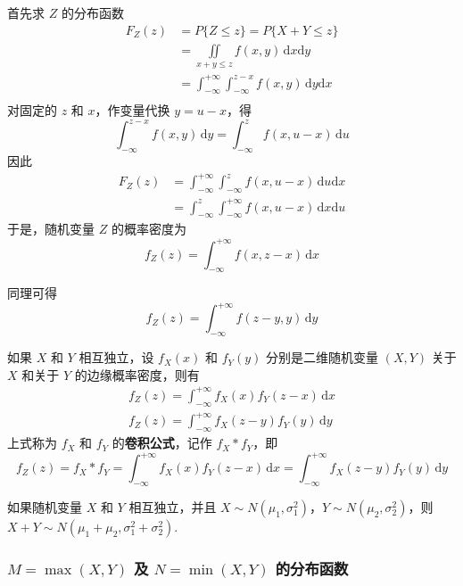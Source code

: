 \begin{myproof}
    首先求 $Z$ 的分布函数
    $$
    \begin{aligned}
        F_{Z}(z) &= P\{Z \leqslant z\} = P\{X+Y \leqslant z\} \\
        &= \underset{x+y \leqslant z}{\iint} f(x,y) \, \text{d}x \text{d}y \\
        &= \int_{-\infty}^{+\infty} \int_{-\infty}^{z-x} f(x,y) \, \text{d}y \text{d}x \\
    \end{aligned}
    $$
    对固定的 $z$ 和 $x$，作变量代换 $y=u-x$，得
    $$
    \int_{-\infty}^{z-x} f(x,y) \, \text{d}y = \int_{-\infty}^z f(x,u-x) \, \text{d}u
    $$
    因此
    $$
    \begin{aligned}
        F_{Z}(z) &= \int_{-\infty}^{+\infty} \int_{-\infty}^z f(x,u-x) \, \text{d}u \text{d}x \\
        &= \int_{-\infty}^z \int_{-\infty}^{+\infty} f(x,u-x) \, \text{d}x \text{d}u 
    \end{aligned}
    $$
    于是，随机变量 $Z$ 的概率密度为
    $$
    f_{Z}(z) = \int_{-\infty}^{+\infty} f(x,z-x) \, \text{d}x
    $$

    同理可得
    $$
    f_{Z}(z) = \int_{-\infty}^{+\infty} f(z-y,y) \, \text{d}y
    $$
\end{myproof}

如果 $X$ 和 $Y$ 相互独立，设 $f_{X}(x)$ 和 $f_{Y}(y)$ 分别是二维随机变量 $(X,Y)$ 关于 $X$ 和关于 $Y$ 的边缘概率密度，则有
\begin{gather*}
    f_{Z}(z) = \int_{-\infty}^{+\infty} f_{X}(x) f_{Y}(z-x) \, \text{d}x \\
    f_{Z}(z) = \int_{-\infty}^{+\infty} f_{X}(z-y) f_{Y}(y) \, \text{d}y
\end{gather*}
上式称为 $f_X$ 和 $f_Y$ 的\textbf{卷积公式}，记作 $f_X * f_Y$，即
\begin{equation}
    f_{Z}(z) = f_X * f_Y = \int_{-\infty}^{+\infty} f_{X}(x) f_{Y}(z-x) \, \text{d}x = \int_{-\infty}^{+\infty} f_{X}(z-y) f_{Y}(y) \, \text{d}y
\end{equation}

\begin{conclusion}
    如果随机变量 $X$ 和 $Y$ 相互独立，并且 $X \sim N(\mu_1,\sigma_1^2)$，$Y \sim N(\mu_2,\sigma_2^2)$，则 $X+Y \sim N(\mu_1 + \mu_2, \sigma_1^2 + \sigma_2^2)$.
\end{conclusion}

\subsubsection{$M = \max(X,Y)$ 及 $N = \min(X,Y)$ 的分布函数}

